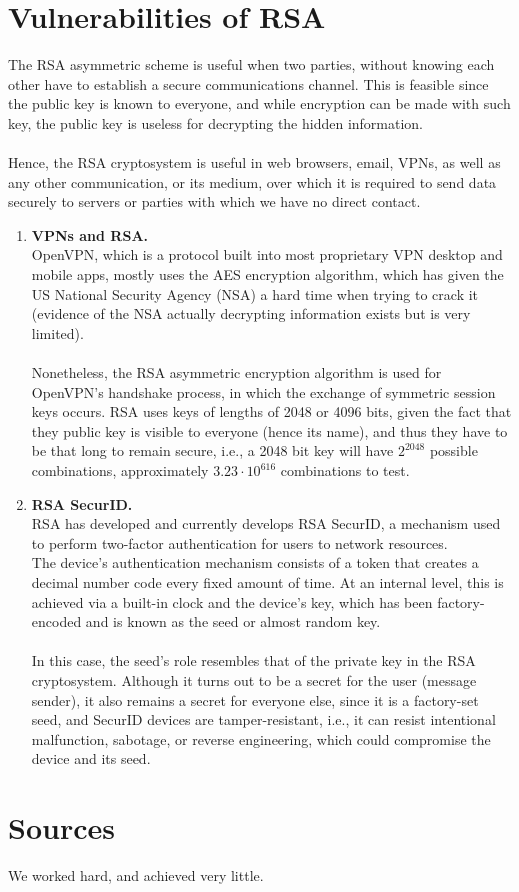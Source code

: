 \documentclass[12pt, a4paper]{article}
\begin{document}
\section{Vulnerabilities of RSA}\label{Vulnerabilities of RSA}
The RSA asymmetric scheme is useful when two parties, without knowing each other have to establish a secure communications channel. This is feasible since the public key is known to everyone, and while encryption can be made with such key, the public key is useless for decrypting the hidden information. \\ \\
Hence, the RSA cryptosystem is useful in web browsers, email, VPNs, as well as any other communication, or its medium, over which it is required to send data securely to servers or parties with which we have no direct contact.
\begin{enumerate}
	\item \textbf{VPNs and RSA.}  \\
	OpenVPN, which is a protocol built into most proprietary VPN desktop and mobile apps, mostly uses the AES encryption algorithm, which has given the US National Security Agency (NSA) a hard time when trying to crack it (evidence of the NSA actually decrypting information exists but is very limited). \\ \\
\indent Nonetheless, the RSA asymmetric encryption algorithm is used for OpenVPN's handshake process, in which the exchange of symmetric session keys occurs.
RSA uses keys of lengths of 2048 or 4096 bits, given the fact that they public key is visible to everyone (hence its name), and thus they have to be that long to remain secure, i.e., a 2048 bit key will have $2^{2048}$ possible combinations, approximately $3.23 \cdot 10^{616}$  combinations to test.

	\item \textbf{RSA SecurID.}  \\
	RSA has developed and currently develops RSA SecurID, a mechanism used to perform two-factor authentication for users to network resources. \\
The device's authentication mechanism consists of a token that creates a decimal number code every fixed amount of time.
At an internal level, this is achieved via a built-in clock and the device’s key, which has been factory-encoded and is known as the seed or almost random key. \\ \\
In this case, the seed’s role resembles that of the private key in the RSA cryptosystem. Although it turns out to be a secret for the user (message sender), it also remains a secret for everyone else, since it is a factory-set seed, and SecurID devices are tamper-resistant, i.e., it can resist intentional malfunction, sabotage, or reverse engineering, which could compromise the device and its seed.



	
	
\end{enumerate}


\section{Sources}\label{sources}
We worked hard, and achieved very little.



\end{document}
